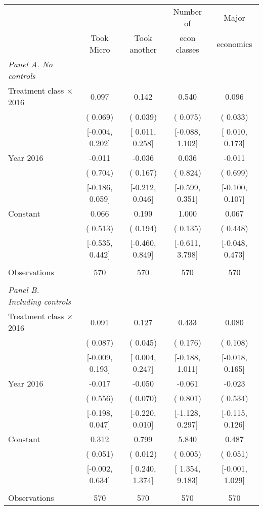 \begin{tabular}{lcccc} \toprule
&  &  & Number of  & Major \tabularnewline
& Took Micro  & Took another  & econ classes  & economics \tabularnewline \midrule
\emph{Panel A. No controls} &  &  &  & \tabularnewline
Treatment class $\times$ 2016 &  0.097 &  0.142 &  0.540 &  0.096\tabularnewline
& ( 0.069) & ( 0.039) & ( 0.075) & ( 0.033)\tabularnewline
& {[}-0.004, 0.202{]} & {[} 0.011, 0.258{]} & {[}-0.088, 1.102{]} & {[} 0.010, 0.173{]}\tabularnewline
Year 2016  & -0.011 & -0.036 &  0.036 & -0.011\tabularnewline
& ( 0.704) & ( 0.167) & ( 0.824) & ( 0.699)\tabularnewline
& {[}-0.186, 0.059{]} & {[}-0.212, 0.046{]} & {[}-0.599, 0.351{]} & {[}-0.100, 0.107{]}\tabularnewline
Constant  &  0.066 &  0.199 &  1.000 &  0.067\tabularnewline
& ( 0.513) & ( 0.194) & ( 0.135) & ( 0.448)\tabularnewline
& {[}-0.535, 0.442{]} & {[}-0.460, 0.849{]} & {[}-0.611, 3.798{]} & {[}-0.048, 0.473{]}\tabularnewline
&  &  &  & \tabularnewline
Observations & 570 & 570 & 570 & 570\tabularnewline
&  &  &  & \tabularnewline
\emph{Panel B. Including controls} &  &  &  & \tabularnewline
Treatment class $\times$ 2016 &  0.091 &  0.127 &  0.433 &  0.080\tabularnewline
& ( 0.087) & ( 0.045) & ( 0.176) & ( 0.108)\tabularnewline
& {[}-0.009, 0.193{]} & {[} 0.004, 0.247{]} & {[}-0.188, 1.011{]} & {[}-0.018, 0.165{]}\tabularnewline
Year 2016  & -0.017 & -0.050 & -0.061 & -0.023 \tabularnewline
& ( 0.556) & ( 0.070) & ( 0.801) & ( 0.534)\tabularnewline
& {[}-0.198, 0.047{]} & {[}-0.220, 0.010{]} & {[}-1.128, 0.297{]} & {[}-0.115, 0.126{]}\tabularnewline
Constant  &  0.312 &  0.799 &  5.840 &  0.487\tabularnewline
& ( 0.051) & ( 0.012) & ( 0.005) & ( 0.051)\tabularnewline
& {[}-0.002, 0.634{]} & {[} 0.240, 1.374{]} & {[} 1.354, 9.183{]} & {[}-0.001, 1.029{]}\tabularnewline
&  &  &  & \tabularnewline
Observations & 570 & 570 & 570 & 570\tabularnewline
\bottomrule \bottomrule
\end{tabular}
